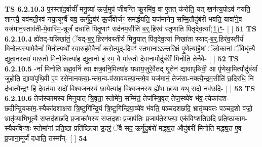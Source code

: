 \documentclass[17pt]{extarticle}
\begin{document}
                  \newline
                                \textbf{ TS 6.2.10.3} \newline
                  प॒रस्ता॑द॒र्वाचीं᳚ मनु॒ष्या॑ ऊर्ज॒मुप॑ जीवन्ति क्रू॒रमि॑व॒ वा ए॒तत् क॑रोति॒ यत् खन॑त्य॒पोऽव॑ नयति॒ शान्त्यै॒ यव॑मती॒रव॑ नय॒त्यूर्ग्वै॑ यव॒ ऊर्गु॑दु॒बंर॑ ऊ॒र्जैवोर्जꣳ॒॒ सम॑र्द्धयति॒ यज॑मानेन॒ सम्मि॒तौदु॑बंरी भवति॒ यावा॑ने॒व यज॑मान॒स्ताव॑ती-मे॒वास्मि॒-न्नूर्जं॑ दधाति पितृ॒णाꣳ सद॑नम॒सीति॑ ब॒र्॒.हिरव॑ स्तृणाति पितृदेव॒त्या᳚(1॒)ꣳ॒- [  ] \textbf{  51} \newline
                  \newline
                                \textbf{ TS 6.2.10.4} \newline
                  ह्ये॑तद्-यन्निखा॑तं॒ ॅयद्-ब॒र्॒.हिरन॑वस्तीर्य मिनु॒यात् पि॑तृदेव॒त्या॑ निखा॑ता स्याद्-ब॒र्॒.हिर॑व॒स्तीर्य॑ मिनोत्य॒स्यामे॒वैनां᳚ मिनो॒त्यथो᳚ स्वा॒रुह॑मे॒वैनां᳚ करो॒त्युद्-दिवꣳ॑ स्तभा॒नाऽऽन्तरि॑क्षं पृ॒णेत्या॑है॒षां ॅलो॒कानां॒ ॅविधृ॑त्यै द्युता॒नस्त्वा॑ मारु॒तो मि॑नो॒त्वित्या॑ह द्युता॒नो ह॑ स्म॒ वै मा॑रु॒तो दे॒वाना॒मौदु॑बंरीं मिनोति॒ तेनै॒वै- [  ] \textbf{  52} \newline
                  \newline
                                \textbf{ TS 6.2.10.5} \newline
                  -नां᳚ मिनोति ब्रह्म॒वनिं॑ त्वा क्षत्र॒वनि॒मित्या॑ह यथाय॒जुरे॒वैतद् घृ॒तेन॑ द्यावापृथिवी॒ आ पृ॑णेथा॒मित्यौदु॑बंर्यां जुहोति॒ द्यावा॑पृथि॒वी ए॒व रसे॑नानक्त्या॒-न्तम॒न्व-व॑स्रावयत्या॒न्तमे॒व यज॑मानं॒ तेज॑सा-नक्त्यै॒न्द्रम॒सीति॑ छ॒दिरधि॒ नि द॑धात्यै॒न्द्रꣳ हि दे॒वत॑या॒ सदो॑ विश्वज॒नस्य॑ छा॒येत्या॑ह विश्वज॒नस्य॒ ह्ये॑षा छा॒या यथ् सदो॒ नव॑छदि॒- [  ] \textbf{  53} \newline
                  \newline
                                \textbf{ TS 6.2.10.6} \newline
                  तेज॑स्कामस्य मिनुयात् त्रि॒वृता॒ स्तोमे॑न॒ सम्मि॑तं॒ तेज॑स्त्रि॒वृत् ते॑ज॒स्व्ये॑व भ॑व॒-त्येका॑दश-छदीन्द्रि॒यका॑म॒-स्यैका॑दशाक्षरा त्रि॒ष्टुगि॑न्द्रि॒यं त्रि॒ष्टुगि॑न्द्रिया॒व्ये॑व भ॑वति॒ पञ्च॑दशछदि॒ भ्रातृ॑व्यवतः पञ्चद॒शो वज्रो॒ भ्रातृ॑व्याभिभूत्यै स॒प्तद॑शछदि प्र॒जाका॑मस्य सप्तद॒शः प्र॒जाप॑तिः प्र॒जाप॑ते॒राप्त्या॒ एक॑विꣳशतिछदि प्रति॒ष्ठाका॑म-स्यैकविꣳ॒॒शः स्तोमा॑नां प्रति॒ष्ठा प्रति॑ष्ठित्या उ॒दरं॒ ॅवै सद॒ ऊर्गु॑दु॒बंरो॑ मद्ध्य॒त औदु॑बंरीं मिनोति मद्ध्य॒त ए॒व प्र॒जाना॒मूर्जं॑ दधाति॒ तस्मा᳚न्- [  ] \textbf{  54} \newline
                  \newline
\end{document}

